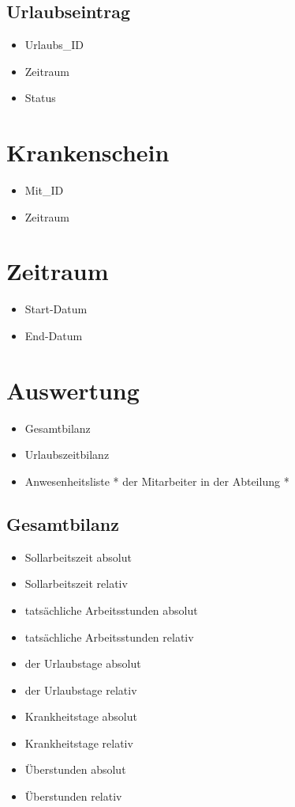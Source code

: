\subsection{Urlaubseintrag}
\begin{itemize}[label=+]
\item[] Urlaubs\_ID
\item Zeitraum
\item Status
\end{itemize}
\section{Krankenschein}
\begin{itemize}[label=+]
\item[] Mit\_ID
\item Zeitraum
\end{itemize}
\section{Zeitraum}
\begin{itemize}[label=+]
\item[] Start-Datum
\item End-Datum
\end{itemize}
\section{Auswertung}
\begin{itemize}[label=+]
\item[] Gesamtbilanz
\item Urlaubszeitbilanz
\item Anwesenheitsliste * der Mitarbeiter in der Abteilung *
\end{itemize}

\subsection{Gesamtbilanz}
\begin{itemize}[label=+]
\item[] Sollarbeitszeit absolut
\item Sollarbeitszeit relativ
\item tatsächliche Arbeitsstunden absolut
\item tatsächliche Arbeitsstunden relativ
\item der Urlaubstage absolut
\item der Urlaubstage relativ
\item Krankheitstage absolut
\item Krankheitstage relativ
\item Überstunden absolut
\item Überstunden relativ
\end{itemize}

